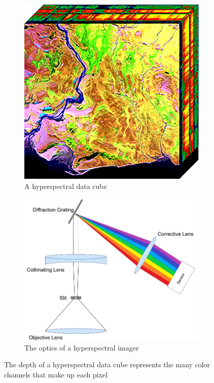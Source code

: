 \documentclass[psamsfonts]{amsart}
\theoremstyle{definition}
\theoremstyle{remark}
\numberwithin{equation}{section}
\begin{document}
\begin{figure}[ht]
  \centering
  \begin{subfigure}[b]{0.37\textwidth}
    \centering
    \includegraphics[width=\textwidth]{datacube.png}
    \caption{A hyperspectral data cube \cite{hsi-cube}}
    \label{fig:image1}
  \end{subfigure}
  \hfill
  \begin{subfigure}[b]{0.53\textwidth}
    \centering
    \includegraphics[width=\textwidth]{hsi_optics.png}
    \caption{The optics of a hyperspectral imager \cite{nat-presentation}}
    \label{fig:image2}
  \end{subfigure}
  \caption{The depth of a hyperspectral data cube represents the many color channels that make up each pixel}
  \label{fig:hsi}
\end{figure}
\end{document}
